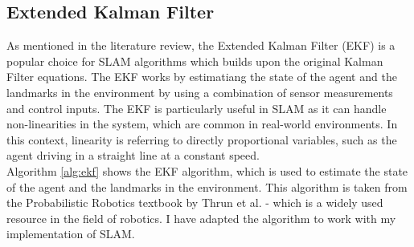 \documentclass[12pt]{article}
\begin{document}
\subsection{Extended Kalman Filter}
As mentioned in the literature review, the Extended Kalman Filter (EKF) is a popular choice for SLAM algorithms which builds upon the
original Kalman Filter equations. The EKF works by estimatiang the state of the agent and the landmarks in the environment by using
a combination of sensor measurements and control inputs. The EKF is particularly useful in SLAM as it can handle non-linearities in
the system, which are common in real-world environments. In this context, linearity is referring to directly proportional variables,
such as the agent driving in a straight line at a constant speed.\\
Algorithm \ref{alg:ekf} shows the EKF algorithm, which is used to estimate the state of the agent and the landmarks in the
environment. This algorithm is taken from the Probabilistic Robotics textbook by Thrun et al. \cite{EKF} - which is a widely used
resource in the field of robotics. I have adapted the algorithm to work with my implementation of SLAM.\\
\end{document}
